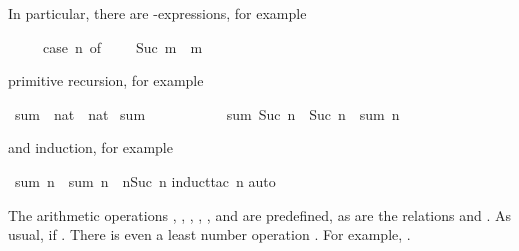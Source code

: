 %
\begin{isabellebody}%
\def\isabellecontext{natsum}%
%
\isadelimtheory
%
\endisadelimtheory
%
\isatagtheory
\isamarkupfalse%
%
\endisatagtheory
{\isafoldtheory}%
%
\isadelimtheory
%
\endisadelimtheory
%
\begin{isamarkuptext}%
\noindent
In particular, there are -expressions, for example
\begin{isabelle}%
\ \ \ \ \ case\ n\ of\ {}\ {\isasymRightarrow}\ {}\ {\isacharbar}\ Suc\ m\ {\isasymRightarrow}\ m%
\end{isabelle}
primitive recursion, for example%
\end{isamarkuptext}%
\isamarkuptrue%
\isamarkupfalse%
\ sum\ {\isacharcolon}{\isacharcolon}\ {\isachardoublequoteopen}nat\ {\isasymRightarrow}\ nat{\isachardoublequoteclose}\isanewline
{}\isamarkupfalse%
\ {\isachardoublequoteopen}sum\ {}\ {\isacharequal}\ {}{\isachardoublequoteclose}\isanewline
\ \ \ \ \ \ \ \ {\isachardoublequoteopen}sum\ {\isacharparenleft}Suc\ n{\isacharparenright}\ {\isacharequal}\ Suc\ n\ {\isacharplus}\ sum\ n{\isachardoublequoteclose}%
\begin{isamarkuptext}%
\noindent
and induction, for example%
\end{isamarkuptext}%
\isamarkuptrue%
\isamarkupfalse%
\ {\isachardoublequoteopen}sum\ n\ {\isacharplus}\ sum\ n\ {\isacharequal}\ n{\isacharasterisk}{\isacharparenleft}Suc\ n{\isacharparenright}{\isachardoublequoteclose}\isanewline
%
\isadelimproof
%
\endisadelimproof
%
\isatagproof
{}\isamarkupfalse%
{\isacharparenleft}induct{\isacharunderscore}tac\ n{\isacharparenright}\isanewline
{}\isamarkupfalse%
{\isacharparenleft}auto{\isacharparenright}\isanewline
{}\isamarkupfalse%
%
\endisatagproof
{\isafoldproof}%
%
\isadelimproof
%
\endisadelimproof
%
\begin{isamarkuptext}%
\newcommand{\mystar}{*%
}
%
The arithmetic operations ,
, \isadxboldpos{\mystar}{$HOL2arithfun},
, ,  and
 are predefined, as are the relations
 and
. As usual,  if
. There is even a least number operation
\@.  For example, .

\end{isamarkuptext}
\end{isabellebody}

